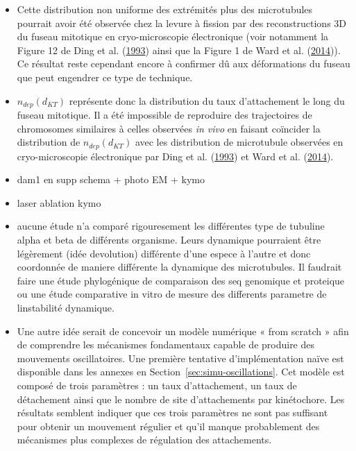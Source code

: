 \documentclass[12pt,a4paper,twoside,openright]{book}
\begin{document}
\begin{itemize}
\item
  Cette distribution non uniforme des extrémités plus des microtubules
  pourrait avoir été observée chez la levure à fission par des
  reconstructions 3D du fuseau mitotique en cryo-microscopie
  électronique (voir notamment la Figure 12 de Ding et al.
  (\hyperref[ref-Ding1993a]{1993}) ainsi que la Figure 1 de Ward et al.
  (\hyperref[ref-Ward2014]{2014})). Ce résultat reste cependant encore à
  confirmer dû aux déformations du fuseau que peut engendrer ce type de
  technique.
\item
  \(n_{dep}(d_{KT})\) représente donc la distribution du taux
  d'attachement le long du fuseau mitotique. Il a été impossible de
  reproduire des trajectoires de chromosomes similaires à celles
  observées \emph{in vivo} en faisant coïncider la distribution de
  \(n_{dep}(d_{KT})\) avec les distribution de microtubule observées en
  cryo-microscopie électronique par Ding et al.
  (\hyperref[ref-Ding1993a]{1993}) et Ward et al.
  (\hyperref[ref-Ward2014]{2014}).
\item
  dam1 en supp schema + photo EM + kymo
\item
  laser ablation kymo
\item
  aucune étude n'a comparé rigouresement les différentes type de
  tubuline alpha et beta de différents organisme. Leurs dynamique
  pourraient être légèrement (idée devolution) différente d'une espece à
  l'autre et donc coordonnée de maniere différente la dynamique des
  microtubules. Il faudrait faire une étude phylogénique de comparaison
  des seq genomique et proteique ou une étude comparative in vitro de
  mesure des differents parametre de linstabilité dynamique.
\item
  Une autre idée serait de concevoir un modèle numérique « from scratch
  » afin de comprendre les mécanismes fondamentaux capable de produire
  des mouvements oscillatoires. Une première tentative d'implémentation
  naïve est disponible dans les annexes en
  Section~\ref{sec:simu-oscillations}. Cet modèle est composé de trois
  paramètres : un taux d'attachement, un taux de détachement ainsi que
  le nombre de site d'attachements par kinétochore. Les résultats
  semblent indiquer que ces trois paramètres ne sont pas suffisant pour
  obtenir un mouvement régulier et qu'il manque probablement des
  mécanismes plus complexes de régulation des attachements.
\end{itemize}

\appendix
\end{document}
